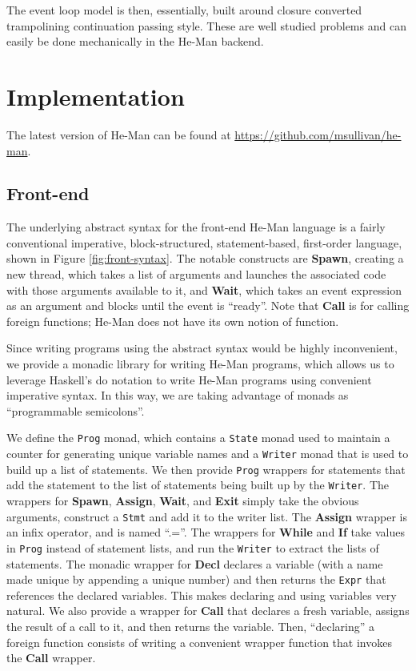 \documentclass[preprint]{sigplanconf}
\renewcommand{\t}{\texttt}
\renewcommand{\b}{\textbf}
\begin{document}
The event loop model is then, essentially, built around closure
converted trampolining continuation passing style. These are well
studied problems and can easily be done mechanically in the He-Man
backend.

\section{Implementation}

The latest version of He-Man can be found at
\url{https://github.com/msullivan/he-man}.

\subsection{Front-end}

The underlying abstract syntax for the front-end He-Man language is a
fairly conventional imperative, block-structured, statement-based,
first-order language, shown in Figure \ref{fig:front-syntax}. The
notable constructs are \b{Spawn}, creating a new thread, which takes a
list of arguments and launches the associated code with those
arguments available to it, and \b{Wait}, which takes an event
expression as an argument and blocks until the event is
``ready''. Note that \b{Call} is for calling foreign functions; He-Man
does not have its own notion of function.

Since writing programs using the abstract syntax would be highly
inconvenient, we provide a monadic library for writing He-Man
programs, which allows us to leverage Haskell's do notation to write
He-Man programs using convenient imperative syntax. In this way, we
are taking advantage of monads as ``programmable semicolons''.

We define the \t{Prog} monad, which contains a \t{State} monad used to
maintain a counter for generating unique variable names and a
\t{Writer} monad that is used to build up a list of statements. We
then provide \t{Prog} wrappers for statements that add the statement
to the list of statements being built up by the \t{Writer}. The
wrappers for \b{Spawn}, \b{Assign}, \b{Wait}, and \b{Exit} simply take
the obvious arguments, construct a \t{Stmt} and add it to the writer
list. The \b{Assign} wrapper is an infix operator, and is named
``.=''. The wrappers for \b{While} and \b{If} take values in \t{Prog}
instead of statement lists, and run the \t{Writer} to extract the
lists of statements. The monadic wrapper for \b{Decl} declares a
variable (with a name made unique by appending a unique number) and
then returns the \t{Expr} that references the declared variables. This
makes declaring and using variables very natural. We also provide a
wrapper for \b{Call} that declares a fresh variable, assigns the
result of a call to it, and then returns the variable. Then,
``declaring'' a foreign function consists of writing a convenient
wrapper function that invokes the \b{Call} wrapper.
\end{document}
